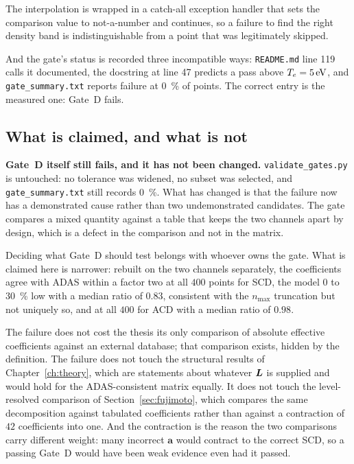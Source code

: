 The interpolation is wrapped in a catch-all exception handler that sets the
comparison value to not-a-number and continues, so a failure to find the right
density band is indistinguishable from a point that was legitimately skipped.

And the gate's status is recorded three incompatible ways: \texttt{README.md}
line 119 calls it documented, the docstring at line 47 predicts a pass above
$T_e = \SI{5}{\electronvolt}$, and \texttt{gate\_summary.txt} reports failure
at \SI{0}{\percent} of points. The correct entry is the measured one: Gate~D
fails.

\subsection{What is claimed, and what is not}

\textbf{Gate~D itself still fails, and it has not been changed.}
\texttt{validate\_gates.py} is untouched: no tolerance was widened, no subset
was selected, and \texttt{gate\_summary.txt} still records
\SI{0}{\percent}. What has changed is that the failure now has a demonstrated
cause rather than two undemonstrated candidates. The gate compares a mixed
quantity against a table that keeps the two channels apart by design, which is
a defect in the comparison and not in the matrix.

Deciding what Gate~D should test belongs with whoever owns the gate. What is
claimed here is narrower: rebuilt on the two channels separately, the
coefficients agree with ADAS within a factor two at all $400$ points for SCD,
the model $0$ to \SI{30}{\percent} low with a median ratio of $0.83$, consistent
with the $n_{\max}$ truncation but not uniquely so, and at all $400$ for ACD
with a median ratio of $0.98$.

The failure does not cost the thesis its only comparison of absolute effective
coefficients against an external database; that comparison exists, hidden by
the definition. The failure does not touch the structural results
of Chapter~\ref{ch:theory}, which are statements about whatever $\bm{L}$ is
supplied and would hold for the ADAS-consistent matrix equally. It does not
touch the level-resolved comparison of Section~\ref{sec:fujimoto}, which
compares the same decomposition against tabulated coefficients rather than
against a contraction of $42$ coefficients into one. And the contraction is the
reason the two comparisons carry different weight: many incorrect $\bm{a}$ would
contract to the correct SCD, so a passing Gate~D would have been weak evidence
even had it passed.

